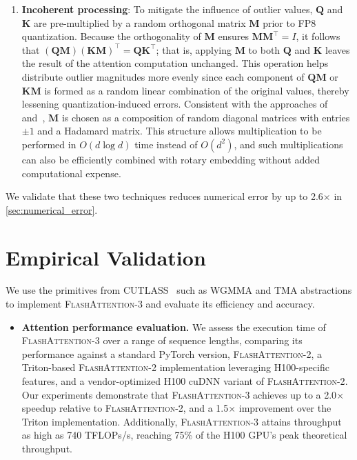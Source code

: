 \begin{algorithm}[H]
\begin{algorithmic}[1]
\begin{enumerate}
\item \textbf{Incoherent processing}: To mitigate the influence of outlier values, $\mathbf{Q}$ and $\mathbf{K}$ are pre-multiplied by a random orthogonal matrix $\mathbf{M}$ prior to FP8 quantization. Because the orthogonality of $\mathbf{M}$ ensures $\mathbf{M} \mathbf{M}^\top = I$, it follows that $(\mathbf{Q} \mathbf{M}) (\mathbf{K} \mathbf{M})^\top = \mathbf{Q} \mathbf{K}^\top$; that is, applying $\mathbf{M}$ to both $\mathbf{Q}$ and $\mathbf{K}$ leaves the result of the attention computation unchanged. This operation helps distribute outlier magnitudes more evenly since each component of $\mathbf{Q} \mathbf{M}$ or $\mathbf{K} \mathbf{M}$ is formed as a random linear combination of the original values, thereby lessening quantization-induced errors. Consistent with the approaches of \citet{chee2024quip} and~\citet{tseng2024quip}, $\mathbf{M}$ is chosen as a composition of random diagonal matrices with entries $\pm 1$ and a Hadamard matrix. This structure allows multiplication to be performed in $O(d \log d)$ time instead of $O(d^2)$, and such multiplications can also be efficiently combined with rotary embedding without added computational expense.
\end{enumerate}

We validate that these two techniques reduces numerical error by up to 2.6$\times$ in \cref{sec:numerical_error}.

\section{Empirical Validation}
\label{sec:exp}

We use the primitives from CUTLASS~\citep{Thakkar_CUTLASS_2023} such as WGMMA and TMA abstractions to implement \textsc{FlashAttention-3} and evaluate its efficiency and accuracy.

\begin{itemize}

\item \textbf{Attention performance evaluation.} We assess the execution time of \textsc{FlashAttention-3} over a range of sequence lengths, comparing its performance against a standard PyTorch version, \textsc{FlashAttention-2}, a Triton-based \textsc{FlashAttention-2} implementation leveraging H100-specific features, and a vendor-optimized H100 cuDNN variant of \textsc{FlashAttention-2}. Our experiments demonstrate that \textsc{FlashAttention-3} achieves up to a 2.0$\times$ speedup relative to \textsc{FlashAttention-2}, and a 1.5$\times$ improvement over the Triton implementation. Additionally, \textsc{FlashAttention-3} attains throughput as high as 740 TFLOPs/s, reaching 75\% of the H100 GPU’s peak theoretical throughput.


\end{itemize}
\end{algorithmic}
\end{algorithm}
